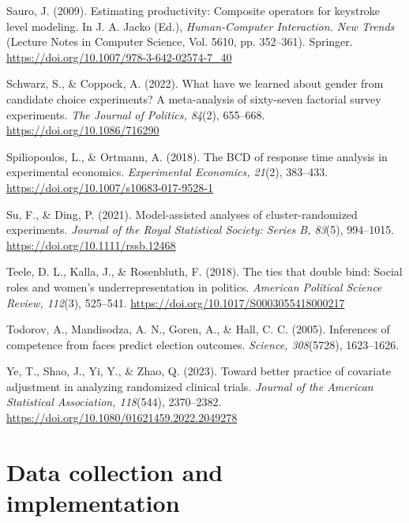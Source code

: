 \documentclass[11pt]{article}\usepackage[]{graphicx}\usepackage[]{xcolor}
\begin{document}
{\begin{list}{}{%
  \setlength{\leftmargin}{1.5em}%
  \setlength{\itemindent}{-1.5em}%
  \setlength{\itemsep}{0pt}%
  \setlength{\parsep}{0pt}%
  \setlength{\topsep}{1pt}%
}
\item Sauro, J. (2009). Estimating productivity: Composite operators for keystroke level modeling. In J. A. Jacko (Ed.), \emph{Human-Computer Interaction. New Trends} (Lecture Notes in Computer Science, Vol. 5610, pp. 352--361). Springer. \url{https://doi.org/10.1007/978-3-642-02574-7_40}

\item Schwarz, S., \& Coppock, A. (2022). What have we learned about gender from candidate choice experiments? A meta-analysis of sixty-seven factorial survey experiments. \emph{The Journal of Politics, 84}(2), 655--668. \url{https://doi.org/10.1086/716290}

\item Spiliopoulos, L., \& Ortmann, A. (2018). The BCD of response time analysis in experimental economics. \emph{Experimental Economics, 21}(2), 383--433. \url{https://doi.org/10.1007/s10683-017-9528-1}

\item Su, F., \& Ding, P. (2021). Model-assisted analyses of cluster-randomized experiments. \emph{Journal of the Royal Statistical Society: Series B, 83}(5), 994--1015. \url{https://doi.org/10.1111/rssb.12468}

\item Teele, D. L., Kalla, J., \& Rosenbluth, F. (2018). The ties that double bind: Social roles and women's underrepresentation in politics. \emph{American Political Science Review, 112}(3), 525--541. \url{https://doi.org/10.1017/S0003055418000217}

\item Todorov, A., Mandisodza, A. N., Goren, A., \& Hall, C. C. (2005). Inferences of competence from faces predict election outcomes. \emph{Science, 308}(5728), 1623--1626.

\item Ye, T., Shao, J., Yi, Y., \& Zhao, Q. (2023). Toward better practice of covariate adjustment in analyzing randomized clinical trials. \emph{Journal of the American Statistical Association, 118}(544), 2370--2382. \url{https://doi.org/10.1080/01621459.2022.2049278}
\end{list}
}

\clearpage
\appendix
\renewcommand{\thetable}{A\arabic{table}}
\renewcommand{\thefigure}{A\arabic{figure}}
\setcounter{table}{0}
\setcounter{figure}{0}
\section{Data collection and implementation}
\label{app:collection}
\end{document}
